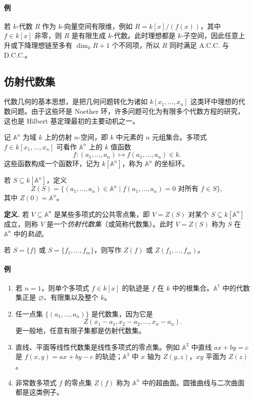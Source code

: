 \paragraph{例}
若 $k$-代数 $R$ 作为 $k$-向量空间有限维，例如 $R=k[x]/(f(x))$，其中 $f\in k[x]$ 非零，则 $R$ 是有限生成 $k$-代数。此时理想都是 $k$-子空间，因此任意上升或下降理想链至多有 $\dim_k R+1$ 个不同项，所以 $R$ 同时满足 A.C.C. 与 D.C.C.。

\subsection*{仿射代数集}

代数几何的基本思想，是把几何问题转化为诸如 $k[x_1,\ldots,x_n]$ 这类环中理想的代数问题。由于这些环是 Noether 环，许多问题可化为有限多个代数方程的研究，这也是 Hilbert 基定理最初的主要动机之一。

记 $\mathbb A^n$ 为域 $k$ 上的仿射 $n$-空间，即 $k$ 中元素的 $n$ 元组集合。多项式 $f\in k[x_1,\ldots,x_n]$ 可看作 $\mathbb A^n$ 上的 $k$ 值函数
\[
f:(a_1,
\ldots,a_n)\longmapsto f(a_1,\ldots,a_n)\in k.
\]
这些函数构成一个函数环，记为 $k[\mathbb A^n]$，称为 $\mathbb A^n$ 的坐标环。

若 $S\subseteq k[\mathbb A^n]$，定义
\[
Z(S)=\{(a_1,\ldots,a_n)\in\mathbb A^n\mid f(a_1,\ldots,a_n)=0\text{ 对所有 }f\in S\},
\]
其中 $Z(0)=\mathbb A^n$。

\noindent\textbf{定义.} 若 $V\subseteq\mathbb A^n$ 是某些多项式的公共零点集，即 $V=Z(S)$ 对某个 $S\subseteq k[\mathbb A^n]$ 成立，则称 $V$ 是一个\emph{仿射代数集}（或简称代数集）。此时 $V=Z(S)$ 称为 $S$ 在 $\mathbb A^n$ 中的\emph{轨迹}。

若 $S=\{f\}$ 或 $S=\{f_1,\ldots,f_m\}$，则写作 $Z(f)$ 或 $Z(f_1,\ldots,f_m)$。

\paragraph{例}
\begin{enumerate}[label=(\arabic*)]
	\item 若 $n=1$，则单个多项式 $f\in k[x]$ 的轨迹是 $f$ 在 $k$ 中的根集合。$\mathbb A^1$ 中的代数集正是 $\varnothing$、有限集以及整个 $k$。
	\item 任一点集 $\{(a_1,\ldots,a_n)\}$ 是代数集，因为它是
	\[
	Z(x_1-a_1,x_2-a_2,\ldots,x_n-a_n).
	\]
	更一般地，任意有限子集都是仿射代数集。
	\item 直线、平面等线性代数集是线性多项式的零点集。例如 $\mathbb A^2$ 中直线 $ax+by=c$ 是 $f(x,y)=ax+by-c$ 的轨迹；$\mathbb A^3$ 中 $x$ 轴为 $Z(y,z)$，$xy$ 平面为 $Z(z)$。
	\item 非常数多项式 $f$ 的零点集 $Z(f)$ 称为 $\mathbb A^n$ 中的超曲面。圆锥曲线与二次曲面都是这类例子。
\end{enumerate}

